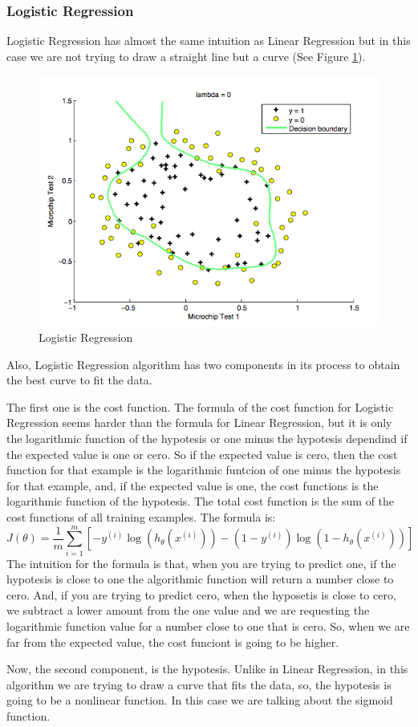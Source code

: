 \documentclass[12pt]{article}
\begin{document}
\subsubsection{Logistic Regression}
Logistic Regression has almost the same intuition as Linear Regression but in this case we are not trying to draw a straight line but a curve (See Figure \ref{fig:figure4}).
\begin{figure}[ht]
\centering
\includegraphics[width=.4\textwidth]{Logistic.png}
\caption{Logistic Regression}
\label{fig:figure4}
\end{figure}
Also, Logistic Regression algorithm has two components in its process to obtain the best curve to fit the data.

The first one is the cost function. The formula of the cost function for Logistic Regression seems harder than the formula for Linear Regression, but it is only the logarithmic function of the hypotesis or one minus the hypotesis dependind if the expected value is one or cero. So if the expected value is cero, then the cost function for that example is the logarithmic funtcion of one minus the hypotesis for that example, and, if the expected value is one, the cost functions is the logarithmic function of the hypotesis. The total cost function is the sum of the cost functions of all training examples. The formula is:
\begin{equation}
  J(\theta)=\frac{1}{m} \displaystyle\sum_{i=1}^{m} [-y^{(i)}\log(h_{\theta}(x^{(i)}))-(1-y^{(i)})\log(1 -h_{\theta}(x^{(i)}))]
\end{equation}
 The intuition for the formula is that, when you are trying to predict one, if the hypotesis is close to one the algorithmic function will return a number close to cero. And, if you are trying to predict cero, when the hyposetis is close to cero, we subtract a lower amount from the one value and we are requesting the logarithmic function value for a number close to one that is cero. So, when we are far from the expected value, the cost funciont is going to be higher.
 
 Now, the second component, is the hypotesis. Unlike in Linear Regression, in this algorithm we are trying to draw a curve that fits the data, so, the hypotesis is going to be a nonlinear function. In this case we are talking about the sigmoid function.
 
\end{document}
